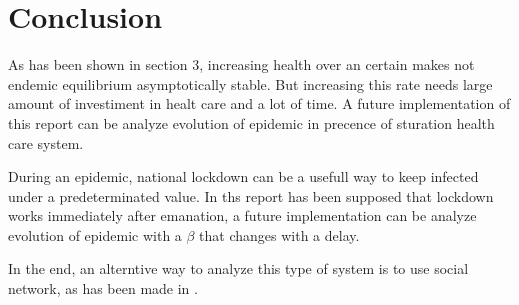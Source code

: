 \section{Conclusion}
As has been shown in section 3, increasing health over an certain makes not endemic equilibrium asymptotically stable. But increasing this rate needs large amount of investiment in healt care and a lot of time. A future implementation of this report can be analyze evolution of epidemic in precence of sturation health care system.

During an epidemic, national lockdown can be a usefull way to keep infected under a predeterminated value. In ths report has been supposed that lockdown works immediately after emanation, a future implementation can be analyze evolution of epidemic with a $\beta$ that changes with a delay.

In the end, an alterntive way to analyze this type of system is to use social network, as has been made in \cite{bib:social_network_di_bernardo}.
